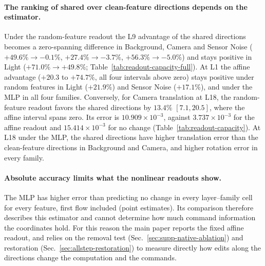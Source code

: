 \paragraph{The ranking of shared over clean-feature directions depends on the estimator.}
Under the random-feature readout the L9 advantage of the shared directions becomes a zero-spanning difference in Background, Camera and Sensor Noise ($+49.6\%\to-0.1\%$, $+27.4\%\to-3.7\%$, $+56.3\%\to-5.0\%$) and stays positive in Light ($+71.0\%\to+49.8\%$; Table~\ref{tab:readout-capacity-full}). At L1 the affine advantage ($+20.3$ to $+74.7\%$, all four intervals above zero) stays positive under random features in Light ($+21.9\%$) and Sensor Noise ($+17.1\%$), and under the MLP in all four families. Conversely, for Camera translation at L18, the random-feature readout favors the shared directions by $13.4\%$ $[7.1,20.5]$, where the affine interval spans zero. Its error is $10.909\times10^{-3}$, against $3.737\times10^{-3}$ for the affine readout and $15.414\times10^{-3}$ for no change (Table~\ref{tab:readout-capacity}). At L18 under the MLP, the shared directions have higher translation error than the clean-feature directions in Background and Camera, and higher rotation error in every family. 

\paragraph{Absolute accuracy limits what the nonlinear readouts show.}
The MLP has higher error than predicting no change in every layer--family cell for every feature, first flow included (point estimates). Its comparison therefore describes this estimator and cannot determine how much command information the coordinates hold. For this reason the main paper reports the fixed affine readout, and relies on the removal test (Sec.~\ref{sec:supp-native-ablation}) and restoration (Sec.~\ref{sec:allstep-restoration}) to measure directly how edits along the directions change the computation and the commands.



